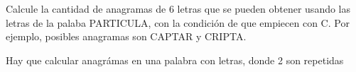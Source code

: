 \begin{enunciado}{\ejExtra}
        Calcule la cantidad de anagramas de 6 letras que se pueden obtener usando las letras de la palaba PARTICULA, con la condición de que empiecen con C.
        Por ejemplo, posibles anagramas son CAPTAR y CRIPTA.
\end{enunciado}

Hay que calcular anagrámas en una palabra con  letras, donde 2 son repetidas


\begin{aportes}
\item {}
\end{aportes}
